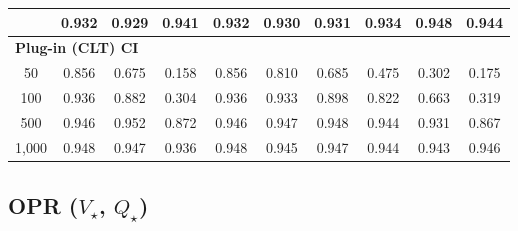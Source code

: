 \documentclass{article}
\numberwithin{equation}{section}
\begin{document}
\begin{table}[ht]
\begin{tabular}{c|ccc|cccccc}
& \cellcolor{covheat!91!white}0.932 & \cellcolor{covheat!90!white}0.929 & \cellcolor{covheat!96!white}0.941
& \cellcolor{covheat!91!white}0.932 & \cellcolor{covheat!90!white}0.930 & \cellcolor{covheat!91!white}0.931 & \cellcolor{covheat!92!white}0.934 & \cellcolor{covheat!99!white}0.948 & \cellcolor{covheat!97!white}0.944 \\
\hline
\multicolumn{10}{l}{\textbf{Plug-in (CLT) CI}} \\ \hline
50
& \cellcolor{covheat!53!white}0.856 & 0.675 & 0.158
& \cellcolor{covheat!53!white}0.856 & \cellcolor{covheat!30!white}0.810 & 0.685 & 0.475 & 0.302 & 0.175 \\
100
& \cellcolor{covheat!93!white}0.936 & \cellcolor{covheat!66!white}0.882 & 0.304
& \cellcolor{covheat!93!white}0.936 & \cellcolor{covheat!92!white}0.933 & \cellcolor{covheat!74!white}0.898 & \cellcolor{covheat!36!white}0.822 & 0.663 & 0.319 \\
500
& \cellcolor{covheat!98!white}0.946 & \cellcolor{covheat!100!white}0.952 & \cellcolor{covheat!61!white}0.872
& \cellcolor{covheat!98!white}0.946 & \cellcolor{covheat!98!white}0.947 & \cellcolor{covheat!99!white}0.948 & \cellcolor{covheat!97!white}0.944 & \cellcolor{covheat!91!white}0.931 & \cellcolor{covheat!59!white}0.867 \\
1{,}000
& \cellcolor{covheat!99!white}0.948 & \cellcolor{covheat!98!white}0.947 & \cellcolor{covheat!93!white}0.936
& \cellcolor{covheat!99!white}0.948 & \cellcolor{covheat!98!white}0.945 & \cellcolor{covheat!98!white}0.947 & \cellcolor{covheat!97!white}0.944 & \cellcolor{covheat!96!white}0.943 & \cellcolor{covheat!98!white}0.946 \\
\hline
\end{tabular}
\end{table}

\clearpage
\subsection{OPR ($V_\star$, $Q_\star$)}
\label{app:opr-tables}
\end{document}
